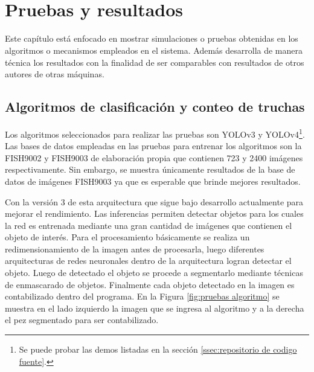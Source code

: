 
\pagestyle{myportland}
\doublespacing
\chapter[\quad\quad\quad\quad ----- Pruebas y resultados]{\\ Pruebas y resultados}
\thispagestyle{myportland}

Este capítulo está enfocado en mostrar simulaciones o pruebas obtenidas en los algoritmos o mecanismos empleados en el sistema. Además desarrolla de manera técnica los resultados con la finalidad de ser comparables con resultados de otros autores de otras máquinas.






\section{Algoritmos de clasificación y conteo de truchas}

Los algoritmos seleccionados para realizar las pruebas son YOLOv3 y YOLOv4\footnote{Se puede probar las demos listadas en la sección \ref{ssec:repositorio de codigo fuente}.}. Las bases de datos empleadas en las pruebas para entrenar los algoritmos son la FISH9002 y FISH9003 de elaboración propia que contienen 723 y 2400 imágenes respectivamente. Sin embargo, se muestra únicamente resultados de la base de datos de imágenes FISH9003 ya que es esperable que brinde mejores resultados.

Con la versión 3 de esta arquitectura que sigue bajo desarrollo actualmente para mejorar el rendimiento. Las inferencias permiten detectar objetos para los cuales la red es entrenada mediante una gran cantidad de imágenes que contienen el objeto de interés. Para el procesamiento básicamente se realiza un redimensionamiento de la imagen antes de procesarla, luego diferentes arquitecturas de redes neuronales dentro de la arquitectura logran detectar el objeto. Luego de detectado el objeto se procede a segmentarlo mediante técnicas de enmascarado de objetos. Finalmente cada objeto detectado en la imagen es contabilizado dentro del programa. En la Figura \ref{fig:pruebas algoritmo} se muestra en el lado izquierdo la imagen que se ingresa al algoritmo y a la derecha el pez segmentado para ser contabilizado.

